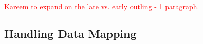 \documentclass[acmtog,natbib=false]{acmart}
\newcommand{\todo}[1]{\textcolor{red}{#1}}
\newcommand{\code}[1]{\texttt{#1}\xspace}
\begin{document}



\todo{Kareem to expand on the late vs. early outling - 1 paragraph.}

\subsection{Handling Data Mapping}
\label{sec:HandlingDataMapping}
\end{document}
